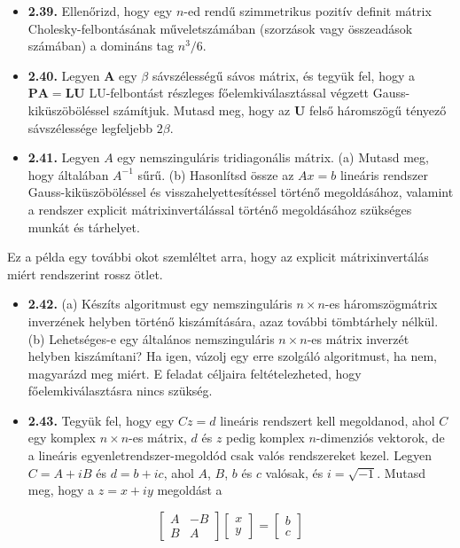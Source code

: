 \documentclass[
  magyar,
  11pt]{article}
\providecommand{\tightlist}{%
  \setlength{\itemsep}{0pt}\setlength{\parskip}{0pt}}
\providecommand{\boldsymbol}[1]{\mathbf{#1}}
\begin{document}
\begin{itemize}
\tightlist
\item
  \textbf{2.39.} Ellenőrizd, hogy egy \(n\)-ed rendű szimmetrikus
  pozitív definit mátrix Cholesky-felbontásának műveletszámában
  (szorzások vagy összeadások számában) a domináns tag \(n^3/6\).
\item
  \textbf{2.40.} Legyen \(\boldsymbol{A}\) egy \(\beta\) sávszélességű
  sávos mátrix, és tegyük fel, hogy a
  \(\boldsymbol{P}\boldsymbol{A} = \boldsymbol{L}\boldsymbol{U}\)
  LU-felbontást részleges főelemkiválasztással végzett
  Gauss-kiküszöböléssel számítjuk. Mutasd meg, hogy az
  \(\boldsymbol{U}\) felső háromszögű tényező sávszélessége legfeljebb
  \(2\beta\).
\item
  \textbf{2.41.} Legyen \(A\) egy nemszinguláris tridiagonális mátrix.
  (a) Mutasd meg, hogy általában \(A^{-1}\) sűrű. (b) Hasonlítsd össze
  az \(Ax = b\) lineáris rendszer Gauss-kiküszöböléssel és
  visszahelyettesítéssel történő megoldásához, valamint a rendszer
  explicit mátrixinvertálással történő megoldásához szükséges munkát és
  tárhelyet.
\end{itemize}

Ez a példa egy további okot szemléltet arra, hogy az explicit
mátrixinvertálás miért rendszerint rossz ötlet.

\begin{itemize}
\tightlist
\item
  \textbf{2.42.} (a) Készíts algoritmust egy nemszinguláris
  \(n \times n\)-es háromszögmátrix inverzének helyben történő
  kiszámítására, azaz további tömbtárhely nélkül. (b) Lehetséges-e egy
  általános nemszinguláris \(n \times n\)-es mátrix inverzét helyben
  kiszámítani? Ha igen, vázolj egy erre szolgáló algoritmust, ha nem,
  magyarázd meg miért. E feladat céljaira feltételezheted, hogy
  főelemkiválasztásra nincs szükség.
\item
  \textbf{2.43.} Tegyük fel, hogy egy \(Cz = d\) lineáris rendszert kell
  megoldanod, ahol \(C\) egy komplex \(n \times n\)-es mátrix, \(d\) és
  \(z\) pedig komplex \(n\)-dimenziós vektorok, de a lineáris
  egyenletrendszer-megoldód csak valós rendszereket kezel. Legyen
  \(C = A + iB\) és \(d = b + ic\), ahol \(A\), \(B\), \(b\) és \(c\)
  valósak, és \(i = \sqrt{-1}\). Mutasd meg, hogy a \(z = x + iy\)
  megoldást a
\end{itemize}

\[\begin{bmatrix} A & -B \\ B & A \end{bmatrix} \begin{bmatrix} x \\ y \end{bmatrix} = \begin{bmatrix} b \\ c \end{bmatrix}\]
\end{document}
